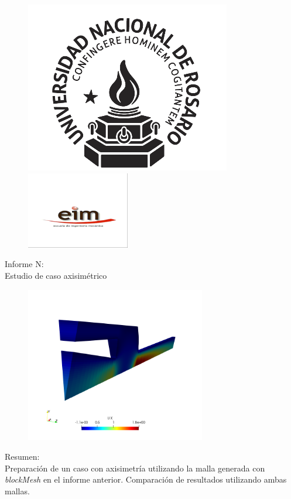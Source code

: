 \documentclass{article}
\begin{document}
\begin{titlepage}
  \begin{figure}[t]
    \centering
    \includegraphics[]{../Figuras_Globales/00_unr.png}
    \hspace{0.15\textwidth}
    \includegraphics[width=0.4\textwidth]{../Figuras_Globales/00_eim.png}
\end{figure}
  
\begin{center}
    {\Huge Informe N:\\ Estudio de caso axisimétrico \par}
    
    
    \begin{figure}[h]
        \centering
        \includegraphics[width=0.7\textwidth]{Figuras/00_intro2.png}
    \end{figure}
    {\Huge Resumen:\\}
   Preparación de un caso con axisimetría utilizando la malla generada con \textit{blockMesh} en el informe anterior. Comparación de resultados utilizando ambas mallas.
    

\end{center}
\end{titlepage}
\end{document}
